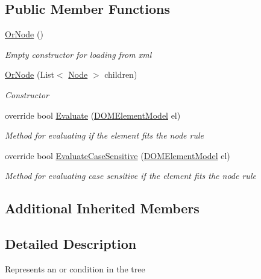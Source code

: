 \subsection*{Public Member Functions}
\begin{DoxyCompactItemize}
\item 
\hyperlink{class_web_analyzer_1_1_models_1_1_settings_model_1_1_expression_tree_1_1_or_node_ae26128547f197be9bd160acdb9f69813}{Or\+Node} ()
\begin{DoxyCompactList}\small\item\em Empty constructor for loading from xml \end{DoxyCompactList}\item 
\hyperlink{class_web_analyzer_1_1_models_1_1_settings_model_1_1_expression_tree_1_1_or_node_aa5d39bf2c74238c099d469f14a753335}{Or\+Node} (List$<$ \hyperlink{class_web_analyzer_1_1_models_1_1_settings_model_1_1_expression_tree_1_1_node}{Node} $>$ children)
\begin{DoxyCompactList}\small\item\em Constructor \end{DoxyCompactList}\item 
override bool \hyperlink{class_web_analyzer_1_1_models_1_1_settings_model_1_1_expression_tree_1_1_or_node_a3dd522940f332bd171c0db7a8b30f0a7}{Evaluate} (\hyperlink{class_web_analyzer_1_1_models_1_1_data_model_1_1_d_o_m_element_model}{D\+O\+M\+Element\+Model} el)
\begin{DoxyCompactList}\small\item\em Method for evaluating if the element fits the node rule \end{DoxyCompactList}\item 
override bool \hyperlink{class_web_analyzer_1_1_models_1_1_settings_model_1_1_expression_tree_1_1_or_node_a690c9013ec5f46532bce12fd221f4f77}{Evaluate\+Case\+Sensitive} (\hyperlink{class_web_analyzer_1_1_models_1_1_data_model_1_1_d_o_m_element_model}{D\+O\+M\+Element\+Model} el)
\begin{DoxyCompactList}\small\item\em Method for evaluating case sensitive if the element fits the node rule \end{DoxyCompactList}\end{DoxyCompactItemize}
\subsection*{Additional Inherited Members}


\subsection{Detailed Description}
Represents an or condition in the tree 




